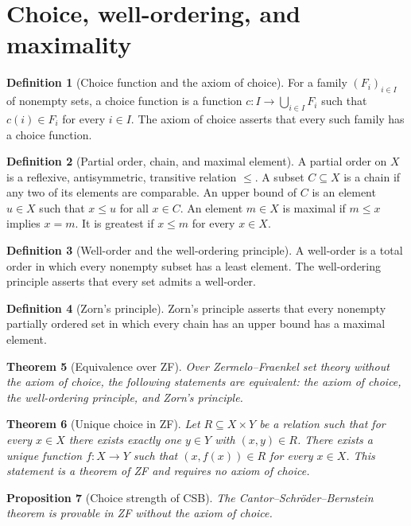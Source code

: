 \documentclass[11pt]{article}
\newtheorem{theorem}{Theorem}[section]
\newtheorem{proposition}[theorem]{Proposition}
\theoremstyle{definition}
\newtheorem{definition}[theorem]{Definition}
\begin{document}
\section{Choice, well-ordering, and maximality}
\begin{definition}[Choice function and the axiom of choice]
For a family $(F_i)_{i\in I}$ of nonempty sets, a choice function is
a function $c:I\to\bigcup_{i\in I}F_i$ such that $c(i)\in F_i$
for every $i\in I$. The axiom of choice asserts that every such
family has a choice function.
\end{definition}
\begin{definition}[Partial order, chain, and maximal element]
A partial order on $X$ is a reflexive, antisymmetric, transitive relation
$\leq$. A subset $C\subseteq X$ is a chain if any two of its elements
are comparable. An upper bound of $C$ is an element $u\in X$ such
that $x\leq u$ for all $x\in C$. An element $m\in X$ is maximal if
$m\leq x$ implies $x=m$. It is greatest if $x\leq m$ for every $x\in X$.
\end{definition}
\begin{definition}[Well-order and the well-ordering principle]
A well-order is a total order in which every nonempty subset has a
least element. The well-ordering principle asserts that every set
admits a well-order.
\end{definition}
\begin{definition}[Zorn's principle]
Zorn's principle asserts that every nonempty partially ordered set
in which every chain has an upper bound has a maximal element.
\end{definition}
\begin{theorem}[Equivalence over ZF]
Over Zermelo--Fraenkel set theory without the axiom of choice, the
following statements are equivalent: the axiom of choice, the
well-ordering principle, and Zorn's principle.
\end{theorem}
\begin{theorem}[Unique choice in ZF]
Let $R\subseteq X\times Y$ be a relation such that for every $x\in X$
there exists exactly one $y\in Y$ with $(x,y)\in R$. There exists a unique
function $f:X\to Y$ such that $(x,f(x))\in R$ for every $x\in X$.
This statement is a theorem of ZF and requires no axiom of choice.
\end{theorem}
\begin{proposition}[Choice strength of CSB]
The Cantor--Schr\"oder--Bernstein theorem is provable in ZF without
the axiom of choice.
\end{proposition}
\end{document}
